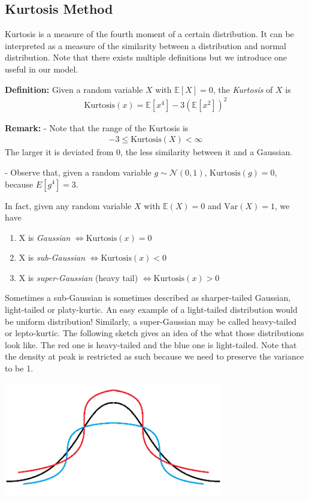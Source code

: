 \subsection{Kurtosis Method}
Kurtosis is a measure of the fourth moment of a certain distribution. It can be interpreted as a measure of the similarity between a distribution and normal distribution. Note that there exists multiple definitions but we introduce one useful in our model.

\textbf{Definition: } Given a random variable $X$ with $\mathbb{E}[X] = 0$, the \textit{Kurtosis} of $X$ is
\begin{align*}
    \text{Kurtosis}(x) = \mathbb{E}[x^4] - 3(\mathbb{E}[x^2])^2
\end{align*}

\textbf{Remark: } \newline
- Note that the range of the Kurtosis is\begin{align*}
     -3 \leq \text{Kurtosis}(X) < \infty
\end{align*}
The larger it is deviated from 0, the less similarity between it and a Gaussian.

- Observe that, given a random variable $g \sim \mathcal{N}(0,1)$,  $\text{Kurtosis}(g) = 0$, because $E[g^4] = 3$.

In fact, given any random variable $X$ with $\mathbb{E}(X)=0$ and $\text{Var}(X) = 1$, we have
 \begin{enumerate}
     \item  X is \textit{Gaussian} $\iff \text{Kurtosis}(x)=0$
     \item  X is \textit{sub-Gaussian}  $\iff \text{Kurtosis}(x)<0$
     \item  X is \textit{super-Gaussian} (heavy tail) $\iff \text{Kurtosis}(x)>0$
 \end{enumerate}
 Sometimes a sub-Gaussian is sometimes described as sharper-tailed Gaussian, light-tailed or platy-kurtic. An easy example of a light-tailed distribution would be uniform distribution! Similarly, a super-Gaussian may be called heavy-tailed or lepto-kurtic. The following sketch gives an idea of the what those distributions look like. The red one is heavy-tailed and the blue one is light-tailed. Note that the density at peak is restricted as such because we need to preserve the variance to be 1. 
 
\includegraphics[height = 5cm]{chapter_6/files/Gaussians.png}


